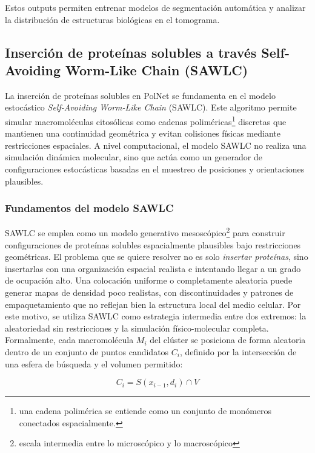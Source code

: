Estos outputs permiten entrenar modelos de segmentación automática y analizar la distribución de estructuras biológicas en el tomograma.

\subsection{Inserción de proteínas solubles a través Self-Avoiding Worm-Like Chain (SAWLC)}

La inserción de proteínas solubles en PolNet se fundamenta en el modelo estocástico \textit{Self-Avoiding Worm-Like Chain} (SAWLC). Este algoritmo permite simular macromoléculas citosólicas como {cadenas poliméricas}\footnote{una cadena polimérica se entiende como un conjunto de monómeros conectados espacialmente.} discretas que mantienen una continuidad geométrica y evitan colisiones físicas mediante restricciones espaciales. A nivel computacional, el modelo SAWLC no realiza una simulación dinámica molecular, sino que actúa como un generador de configuraciones estocásticas basadas en el muestreo de posiciones y orientaciones plausibles.


\subsubsection{Fundamentos del modelo SAWLC}

SAWLC se emplea como un modelo generativo {mesoscópico}\footnote{escala intermedia entre lo microscópico y lo macroscópico} para construir configuraciones de proteínas solubles espacialmente plausibles bajo restricciones geométricas. El problema que se quiere resolver no es solo \textit{insertar proteínas}, sino insertarlas con una organización espacial realista e intentando llegar a un grado de ocupación alto. Una colocación uniforme o completamente aleatoria puede generar mapas de densidad poco realistas, con discontinuidades y patrones de empaquetamiento que no reflejan bien la estructura local del medio celular. Por este motivo, se utiliza SAWLC como estrategia intermedia entre dos extremos: la aleatoriedad sin restricciones y la simulación físico-molecular completa.\\

Formalmente, cada macromolécula $M_i$ del clúster se posiciona de forma aleatoria dentro de un conjunto de puntos candidatos $C_i$, definido por la intersección de una esfera de búsqueda y el volumen permitido:

\begin{equation}
C_i = S(x_{i-1}, d_i) \cap V
\end{equation}

